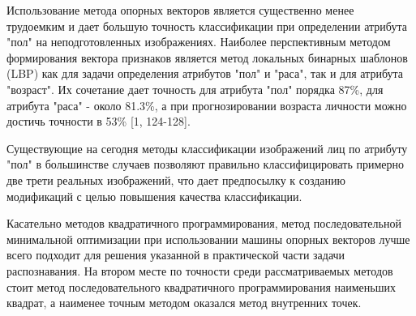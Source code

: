 
Использование метода опорных векторов является существенно менее трудоемким и дает большую точность классификации при определении атрибута "пол" на неподготовленных изображениях. Наиболее перспективным методом формирования вектора признаков является метод локальных бинарных шаблонов (LBP) как для задачи определения атрибутов "пол" и "раса", так и для атрибута "возраст". Их сочетание дает точность для атрибута "пол" порядка 87\%, для атрибута "раса" - около 81.3\%, а при прогнозировании возраста личности можно достичь точности в 53\% [1, 124-128].

Существующие на сегодня методы классификации изображений лиц по атрибуту "пол" в большинстве случаев позволяют правильно классифицировать примерно две трети реальных изображений, что дает предпосылку к созданию модификаций с целью повышения качества классификации.

Касательно методов квадратичного программирования, метод последовательной минимальной оптимизации при использовании машины опорных векторов лучше всего подходит для решения указанной в практической части задачи распознавания. На втором месте по точности среди рассматриваемых методов стоит метод последовательного квадратичного программирования наименьших квадрат, а наименее точным методом оказался метод внутренних точек.

